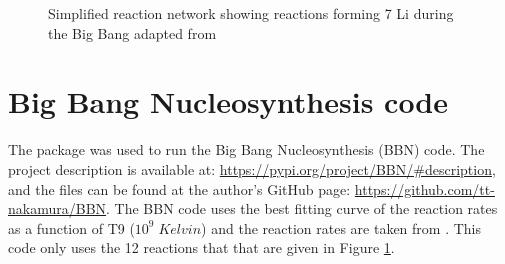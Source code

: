 \documentclass[11pt]{article}
\numberwithin{equation}{section}
\begin{document}
\begin{figure}[H]
	\centering
    \caption{Simplified reaction network showing reactions forming 7 Li during the Big Bang adapted from \cite{Simplified_reaction_network}}
  \label{fig:Simplified reaction network}
\end{figure}

\section{Big Bang Nucleosynthesis code}
The \cite{pypi} package was used to run the Big Bang Nucleosynthesis (BBN) code. The project description is available at: \url{https://pypi.org/project/BBN/#description}, and the files can be found at the author's GitHub page: \url{https://github.com/tt-nakamura/BBN}. The BBN code uses the best fitting curve of the reaction rates as a function of T9 ($10^{9}\; Kelvin$) and the reaction rates are taken from \cite{smith1993experimental}. This code only uses the 12 reactions that that are given in Figure \ref{fig:Simplified reaction network}. \\
\end{document}
